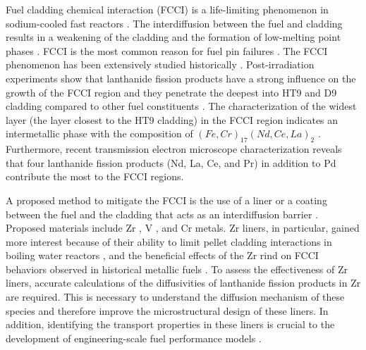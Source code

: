 \documentclass[preprint,12pt]{elsarticle}
\begin{document}
Fuel cladding chemical interaction (FCCI) is a life-limiting phenomenon in sodium-cooled fast reactors \cite{hofman_metallic_1997, pahl_experimental_1990, thomas2021nano}. The interdiffusion between the fuel and cladding results in a weakening of the cladding and the formation of low-melting point phases \cite{keiser_fuel_2019, keiser2009development}. FCCI is the most common reason for fuel pin failures \cite{hofman_metallic_1997,matthews_fuel-cladding_2017}. The FCCI phenomenon has been extensively studied historically \cite{keiser_fuel_2019}. Post-irradiation experiments show that lanthanide fission products have a strong influence on the growth of the FCCI region and they penetrate the deepest into HT9 and D9 cladding compared to other fuel constituents \cite{keiser_fuel_2019, keiser2009development}. The characterization of the widest layer (the layer closest to the HT9 cladding) in the FCCI region indicates an intermetallic phase with the composition of $(Fe, Cr)_{17}(Nd, Ce, La)_{2}$ \cite{keiser_fuel-cladding_2006, harp_scanning_2017}. Furthermore, recent transmission electron microscope characterization \cite{thomas_transmission_2023} reveals that four lanthanide fission products (Nd, La, Ce, and Pr) in addition to Pd contribute the most to the FCCI regions.

A proposed method to mitigate the FCCI is the use of a liner or a coating between the fuel and the cladding that acts as an interdiffusion barrier \cite{beausoleil_fast_2022,crawford_performance_1993, ryu_performance_2009, kim_performance_2009}. Proposed materials include Zr \cite{jee_improvement_2013,lee_effect_2015, beausoleil_fast_2022}, V \cite{lo_vanadium_2014}, and Cr \cite{yang_fcci_2010} metals. Zr liners, in particular, gained more interest because of their ability to limit pellet cladding interactions in boiling water reactors \cite{cox_pellet-clad_1990, chao_study_1993}, and the beneficial effects of the Zr rind on FCCI behaviors observed in historical metallic fuels \cite{keiser_fuel_2019, keiser2009development}. To assess the effectiveness of Zr liners, accurate calculations of the diffusivities of lanthanide fission products in Zr are required. This is necessary to understand the diffusion mechanism of these species and therefore improve the microstructural design of these liners. In addition, identifying the transport properties in these liners is crucial to the development of engineering-scale fuel performance models \cite{aagesen_mechanistic_2023}. 
\end{document}
